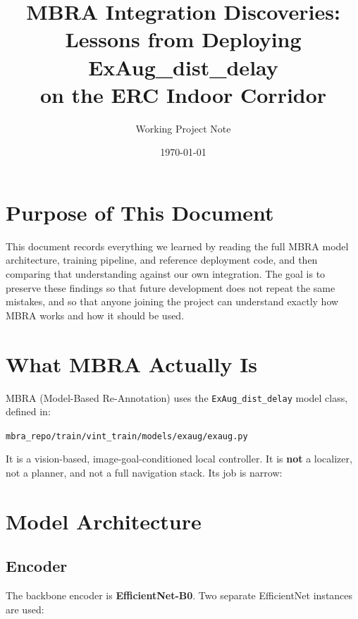 \documentclass[11pt,a4paper]{article}
\title{MBRA Integration Discoveries:\\
Lessons from Deploying ExAug\_dist\_delay\\
on the ERC Indoor Corridor}
\author{Working Project Note}
\date{\today}
\begin{document}
\maketitle

\section{Purpose of This Document}

This document records everything we learned by reading the full MBRA model
architecture, training pipeline, and reference deployment code, and then
comparing that understanding against our own integration.  The goal is to
preserve these findings so that future development does not repeat the same
mistakes, and so that anyone joining the project can understand exactly how
MBRA works and how it should be used.

\section{What MBRA Actually Is}

MBRA (Model-Based Re-Annotation) uses the \texttt{ExAug\_dist\_delay} model
class, defined in:

\begin{center}
\texttt{mbra\_repo/train/vint\_train/models/exaug/exaug.py}
\end{center}

It is a vision-based, image-goal-conditioned local controller.  It is
\textbf{not} a localizer, not a planner, and not a full navigation stack.  Its
job is narrow:

\begin{center}
\end{center}

\section{Model Architecture}

\subsection{Encoder}

The backbone encoder is \textbf{EfficientNet-B0}.  Two separate EfficientNet
instances are used:
\end{document}
